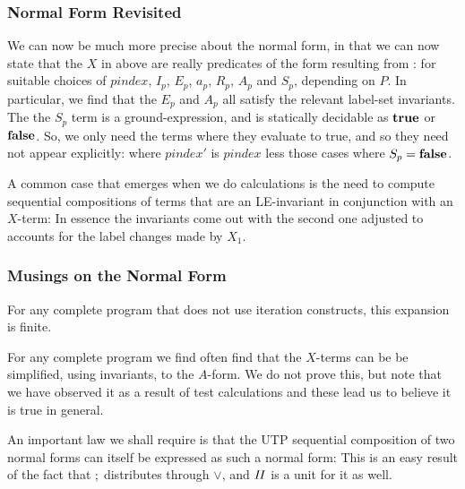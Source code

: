 \newpage
\subsubsection{Normal Form Revisited}

We can now be much more precise about the normal form,
in that we can now state that the $X$ in  above
are really predicates of the form resulting from :
for suitable choices of $pindex$, $I_p$, $E_p$, $a_p$, $R_p$, $A_p$ and $S_p$,
depending on $P$.
In particular, we find that the $E_p$ and $A_p$ all satisfy the relevant
label-set invariants.
The the $S_p$ term  is a ground-expression,
and is statically decidable as $\mathbf{true}$ or $\mathbf{false}$.
So, we only need the terms where they evaluate to true,
and so they need not appear explicitly:
where $pindex'$ is $pindex$ less those cases where $S_p = \mathbf{false}$.

A common case that emerges when we do calculations
is the need to compute sequential compositions
of terms that are an LE-invariant in conjunction with an $X$-term:
In essence the invariants come out with the second
one adjusted to accounts for the label changes made by $X_1$.

\subsubsection{Musings on the Normal Form}

For any complete program that does not use iteration constructs,
this expansion is finite.

For any complete program
we find often find that the $X$-terms
can be be simplified, using invariants,
to the $A$-form.
We do not prove this, but note that we have observed it as a result
of test calculations and these lead us to believe it is true in general.

An important law we shall require is that the UTP sequential
composition of two normal forms can itself be expressed
as such a normal form:
This is an easy result of the fact that $\mathrel{;}$ distributes through $\lor$,
and $\mathit{II}$ is a unit for it as well.

